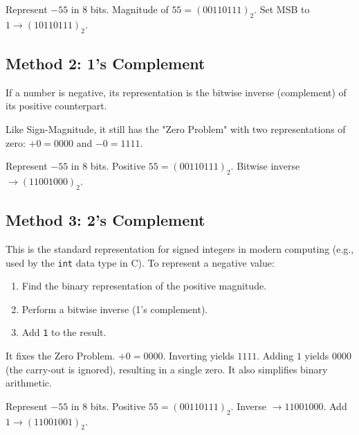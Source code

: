 \begin{example}
Represent $-55$ in 8 bits. Magnitude of $55 = (0011 0111)_2$. Set MSB to $1 \rightarrow (1011 0111)_2$.
\end{example}

\subsection{Method 2: 1's Complement}
If a number is negative, its representation is the bitwise inverse (complement) of its positive counterpart.
\begin{remark}
Like Sign-Magnitude, it still has the "Zero Problem" with two representations of zero: $+0 = 0000$ and $-0 = 1111$.
\end{remark}

\begin{example}[1's Complement]
Represent $-55$ in 8 bits. Positive $55 = (0011 0111)_2$. Bitwise inverse $\rightarrow (1100 1000)_2$.
\end{example}

\subsection{Method 3: 2's Complement}
This is the standard representation for signed integers in modern computing (e.g., used by the \texttt{int} data type in C).
To represent a negative value:
\begin{enumerate}
    \item Find the binary representation of the positive magnitude.
    \item Perform a bitwise inverse (1's complement).
    \item Add \texttt{1} to the result.
\end{enumerate}

\begin{proposition}
It fixes the Zero Problem. $+0 = 0000$. Inverting yields $1111$. Adding $1$ yields $0000$ (the carry-out is ignored), resulting in a single zero. It also simplifies binary arithmetic.
\end{proposition}

\begin{example}[2's Complement]
Represent $-55$ in 8 bits. Positive $55 = (0011 0111)_2$. Inverse $\rightarrow 1100 1000$. Add $1 \rightarrow (1100 1001)_2$.
\end{example}

